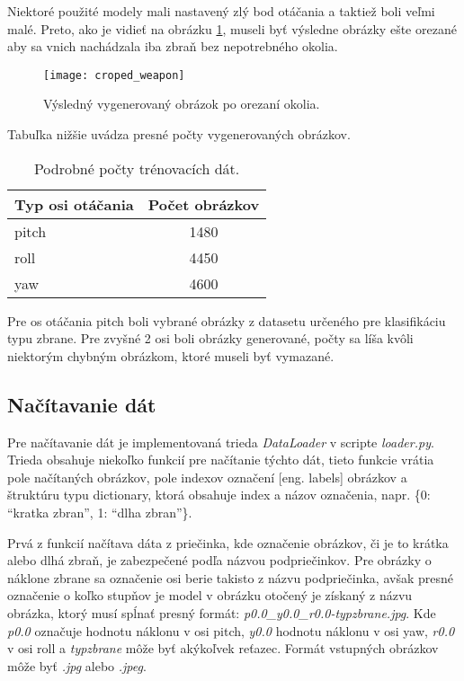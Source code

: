 Niektoré použité modely mali nastavený zlý bod otáčania a taktiež boli veľmi malé.
Preto, ako je vidieť na obrázku \ref{pic:generator3d}, museli byť výsledne obrázky ešte orezané aby sa vnich nachádzala iba zbraň bez nepotrebného okolia.

\begin{figure}[H]
    \centering
    \texttt{[image: croped\_weapon]}
    \caption{Výsledný vygenerovaný obrázok po orezaní okolia.}
    \label{pic:generator3d}
\end{figure}

Tabuľka nižšie uvádza presné počty vygenerovaných obrázkov.

\begin{table}[H]
    \centering
    \label{my-label}
    \begin{tabular}{|l|c|}
        \hline
        Typ osi otáčania & \multicolumn{1}{l|}{Počet obrázkov} \\ \hline
        pitch            & 1480                                \\ \hline
        roll             & 4450                                \\ \hline
        yaw              & 4600                                \\ \hline
        \end{tabular}
    \caption{Podrobné počty trénovacích dát.}
\end{table}

Pre os otáčania pitch boli vybrané obrázky z datasetu určeného pre klasifikáciu typu zbrane.
Pre zvyšné 2 osi boli obrázky generované, počty sa líša kvôli niektorým chybným obrázkom, ktoré museli byť vymazané.

\subsection{Načítavanie dát}
\label{subsec:nacitaniedat}
Pre načítavanie dát je implementovaná trieda \textit{DataLoader} v scripte \textit{loader.py}.
Trieda obsahuje niekoľko funkcií pre načítanie týchto dát, tieto funkcie vrátia pole načítaných obrázkov, pole indexov označení [eng. labels] obrázkov a
    štruktúru typu dictionary, ktorá obsahuje index a názov označenia, napr. \{0: ``kratka zbran'', 1: ``dlha zbran''\}.

Prvá z funkcií načítava dáta z priečinka, kde označenie obrázkov, či je to krátka alebo dlhá zbraň, je zabezpečené podľa názvou podpriečinkov.
Pre obrázky o náklone zbrane sa označenie osi berie takisto z názvu podpriečinka, avšak presné označenie o koľko stupňov je model v obrázku otočený
    je získaný z názvu obrázka, ktorý musí spĺnať presný formát: \textit{p0.0\_y0.0\_r0.0-typzbrane.jpg}.
Kde \textit{p0.0} označuje hodnotu náklonu v osi pitch, \textit{y0.0} hodnotu náklonu v osi yaw, \textit{r0.0} v osi roll a \textit{typzbrane} môže byť
    akýkoľvek reťazec.
Formát vstupných obrázkov môže byť \textit{.jpg} alebo \textit{.jpeg}.

